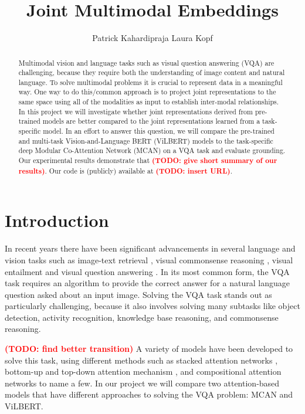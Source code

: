 \documentclass{article}
\title{Joint Multimodal Embeddings}
\author{%
   Patrick Kahardipraja%
  \And
   Laura Kopf \\
}
\newcommand{\todo}[1]{\textbf{\textcolor{Red}{(TODO: #1)}}}
\begin{document}
\maketitle

\begin{abstract}
Multimodal vision and language tasks such as visual question answering (VQA) are challenging, because they require both the understanding of image content and natural language. To solve multimodal problems it is crucial to represent data in a meaningful way. One way to do this/common approach is to project joint representations to the same space using all of the modalities as input to establish inter-modal relationships. In this project we will investigate whether joint representations derived from pre-trained models are better compared to the joint representations learned from a task-specific model. In an effort to answer this question, we will compare the pre-trained and multi-task Vision-and-Language BERT (ViLBERT) \citep{lu2019vilbert, lu2020multitask} models to the task-specific deep Modular Co-Attention Network (MCAN) \citep{yu2019mcan} on a VQA task and evaluate grounding. Our experimental results demonstrate that \todo{give short summary of our results}. Our code is (publicly) available at \todo{insert URL}.
\end{abstract}

\section{Introduction}

In recent years there have been significant advancements in several language and vision tasks such as image-text retrieval \citep{wang2015retrieval}, visual commonsense reasoning \citep{zellers2018vcr}, visual entailment \citep{xie2019entailment} and visual question answering \citep{antol2015vqa, malinowski2014vqa, kim2018vqa, zhao2018vqa}. In its most common form, the VQA task requires an algorithm to provide the correct answer for a natural language question asked about an input image. Solving the VQA task stands out as particularly challenging, because it also involves solving many subtasks like object detection, activity recognition, knowledge base reasoning, and commonsense reasoning. 

\todo{find better transition}
A variety of models have been developed to solve this task, using different methods such as stacked attention networks \citep{yang2016vqa}, bottom-up and top-down attention mechanism \citep{anderson2017vqa}, and compositional attention networks \citep{hudson2018mac} to name a few. In our project we will compare two attention-based models that have different approaches to solving the VQA problem: MCAN and ViLBERT.
\end{document}
